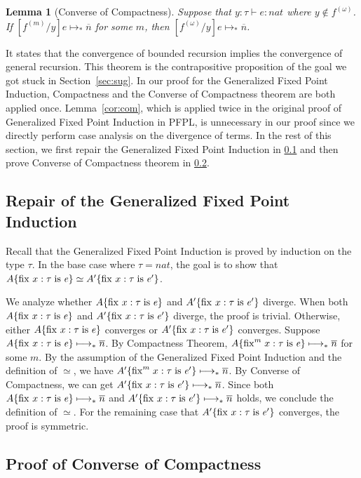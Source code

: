 \documentclass{article}
\newtheorem{lemma}{Lemma}
\begin{document}
\begin{lemma}[Converse of Compactness] \label{lem:cc}
  Suppose that $y:\tau\vdash e:\textit{nat}$ where $y\notin f^{(\omega)}$.
  If $[f^{(m)}/y]e\longmapsto_*\overline{n}$ for some $m$, then $[f^{(\omega)}/y]e\longmapsto_*\overline{n}$.
\end{lemma}

It states that the convergence of bounded recursion implies the convergence of general recursion.
This theorem is the contrapositive proposition of the goal we got stuck in Section~\ref{sec:sug}.
In our proof for the Generalized Fixed Point Induction,
Compactness and the Converse of Compactness theorem are both applied once.
Lemma~\ref{cor:com}, which is applied twice in the original proof of Generalized Fixed Point Induction in PFPL,
is unnecessary in our proof since we directly perform case analysis on the divergence of terms.
In the rest of this section, we first repair the Generalized Fixed Point Induction in \ref{subsec:repair}
and then prove Converse of Compactness theorem in \ref{subsec:converse}.

\subsection{Repair of the Generalized Fixed Point Induction}
\label{subsec:repair}

Recall that the Generalized Fixed Point Induction is proved by
induction on the type $\tau$.
In the base case where $\tau=\textit{nat}$, the goal is to show that
$A\{\mathrm{fix}^{}\;x:\tau\;\mathrm{is}\;\mathit{e}\} \simeq A'\{\mathrm{fix}^{}\;x:\tau\;\mathrm{is}\;\mathit{e'}\}$.

We analyze whether $A\{\mathrm{fix}^{}\;x:\tau\;\mathrm{is}\;\mathit{e}\}$ and $A'\{\mathrm{fix}^{}\;x:\tau\;\mathrm{is}\;\mathit{e'}\}$ diverge.
When both $A\{\mathrm{fix}^{}\;x:\tau\;\mathrm{is}\;\mathit{e}\}$ and $A'\{\mathrm{fix}^{}\;x:\tau\;\mathrm{is}\;\mathit{e'}\}$ diverge, the proof is trivial.
Otherwise, either $A\{\mathrm{fix}^{}\;x:\tau\;\mathrm{is}\;\mathit{e}\}$ converges or $A'\{\mathrm{fix}^{}\;x:\tau\;\mathrm{is}\;\mathit{e'}\}$ converges.
Suppose $A\{\mathrm{fix}^{}\;x:\tau\;\mathrm{is}\;\mathit{e}\}\longmapsto_*\overline{n}$.
By Compactness Theorem, $A\{\mathrm{fix}^{m}\;x:\tau\;\mathrm{is}\;\mathit{e}\} \longmapsto_*\overline{n}$ for some $m$.
By the assumption of the Generalized Fixed Point Induction and the definition of $\simeq$, we have $A'\{\mathrm{fix}^{m}\;x:\tau\;\mathrm{is}\;\mathit{e'}\} \longmapsto_*\overline{n}$.
By Converse of Compactness, we can get $A'\{\mathrm{fix}^{}\;x:\tau\;\mathrm{is}\;\mathit{e'}\} \longmapsto_*\overline{n}$.
Since both $A\{\mathrm{fix}^{}\;x:\tau\;\mathrm{is}\;\mathit{e}\} \longmapsto_*\overline{n}$ and $A'\{\mathrm{fix}^{}\;x:\tau\;\mathrm{is}\;\mathit{e'}\} \longmapsto_*\overline{n}$ holds, we conclude the definition of $\simeq$.
For the remaining case that $A'\{\mathrm{fix}^{}\;x:\tau\;\mathrm{is}\;\mathit{e'}\}$ converges, the proof is symmetric.

\subsection{Proof of Converse of Compactness}
\label{subsec:converse}
\end{document}
